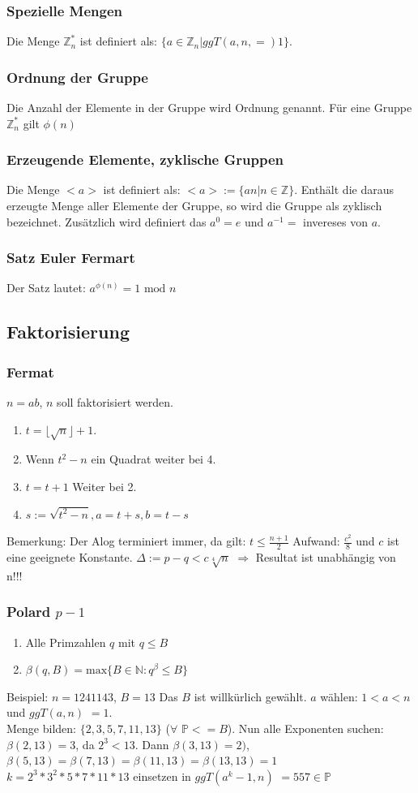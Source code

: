 \documentclass[landscape,twocolumn,a4paper]{article}
\newcommand{\ZN}{\mathbb{Z}} %
\newcommand{\PN}{\mathbb{P}} %
\newcommand{\T}[1]{\text{#1}} %
\newcommand{\Ra}{\Rightarrow}
\begin{document}
\subsubsection{Spezielle Mengen}
Die Menge $\ZN^*_n$ ist definiert als: $\{a \in \ZN_n|ggT(a,n,=)1\}$.
\subsubsection{Ordnung der Gruppe}
Die Anzahl der Elemente in der Gruppe wird Ordnung genannt. Für eine Gruppe $\ZN^*_n$ gilt $\phi(n)$
\subsubsection{Erzeugende Elemente, zyklische Gruppen}
Die Menge $<a>$ ist definiert als: $<a>:= \{an|n \in \ZN\}$. Enthält die daraus erzeugte Menge aller Elemente der Gruppe, so wird die Gruppe als zyklisch bezeichnet. Zusätzlich wird definiert das $a^0 = e$ und $a^{-1} =$ invereses von $a$.
\subsubsection{Satz Euler Fermart}
Der Satz lautet: $a^{\phi(n)} = 1\T{ mod }n$
\subsection{Faktorisierung}
\subsubsection{Fermat}
$n=ab$, $n$ soll faktorisiert werden. 
\begin{enumerate}
\item $t = \lfloor \sqrt n \rfloor + 1$. 
\item Wenn $t^2 - n$ ein Quadrat weiter bei 4.
\item $t = t + 1$ Weiter bei 2.
\item $s := \sqrt{t^2 -n}, a = t + s, b = t - s$
\end{enumerate}
Bemerkung: Der Alog terminiert immer, da gilt: $t \le \frac{n+1}{2}$
Aufwand: $\frac{c^2}{8}$ und $c$ ist eine geeignete Konstante. $\Delta := p-q < c \sqrt[4]{n}$ {\color{red} $\Ra$ Resultat ist unabhängig von n!!!} 

\subsubsection{Polard $p -1$}
\begin{enumerate}
\item Alle Primzahlen $q$ mit $q \le B$
\item $\beta(q, B) = \text{max}\{B \in \mathbb{N}: q^\beta \le B\}$
\end{enumerate}
Beispiel:
$n=1241143$, $B=13$ Das $B$ ist willkürlich gewählt. $a$ wählen: $ 1 < a < n$ und $ggT(a, n)$ $= 1$. \\
Menge bilden: $\{2, 3, 5, 7, 11, 13\}$ ($\forall$ $\PN<=B$). Nun alle Exponenten suchen: $\beta (2, 13) = 3$, da $2^3 < 13$. Dann $\beta (3, 13) = 2)$, 
$\beta (5, 13) = \beta (7, 13) = \beta (11, 13) = \beta (13, 13) = 1$ \\
$k = 2^3 * 3^2 * 5 * 7 * 11 * 13$ einsetzen in $ggT(a^k-1, n)$ $= 557 \in \PN$
\end{document}
